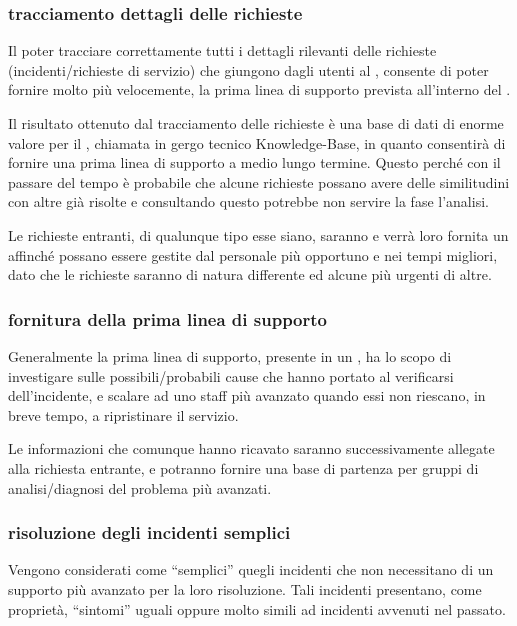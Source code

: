 \subsubsection[Tracciamento dettagli delle richieste]{tracciamento dettagli delle richieste}
Il poter tracciare correttamente tutti i dettagli rilevanti delle richieste (incidenti/richieste di servizio) che giungono dagli utenti al , consente di poter fornire molto più velocemente, la prima linea di supporto prevista all'interno del .

Il risultato ottenuto dal tracciamento delle richieste è una base di dati di enorme valore per il , chiamata in gergo tecnico \ac{Knowledge-Base}, in quanto consentirà di fornire una prima linea di supporto  a medio lungo termine. Questo perché con il passare del tempo è probabile che alcune richieste possano avere delle similitudini con altre già risolte e consultando questo  potrebbe non servire la fase l'analisi.

Le richieste entranti, di qualunque tipo esse siano, saranno  e verrà loro fornita un  affinché possano essere gestite dal personale più opportuno e nei tempi migliori, dato che le richieste saranno di natura differente ed alcune più urgenti di altre.

\subsubsection[Fornitura della prima linea di supporto]{fornitura della prima linea di supporto}
Generalmente la prima linea di supporto, presente in un , ha lo scopo di investigare sulle possibili/probabili cause che hanno portato al verificarsi dell'incidente, e scalare ad uno staff più avanzato quando essi non riescano, in breve tempo, a ripristinare il servizio. 

Le informazioni che comunque hanno ricavato saranno successivamente allegate alla richiesta entrante, e potranno fornire una base di partenza per gruppi di analisi/diagnosi del problema più avanzati.

\subsubsection[Risoluzione degli incidenti semplici]{risoluzione degli incidenti semplici}
Vengono considerati come ``semplici'' quegli incidenti che non necessitano di un supporto più avanzato per la loro risoluzione. Tali incidenti presentano, come proprietà, ``sintomi'' uguali oppure molto simili ad incidenti avvenuti nel passato.

